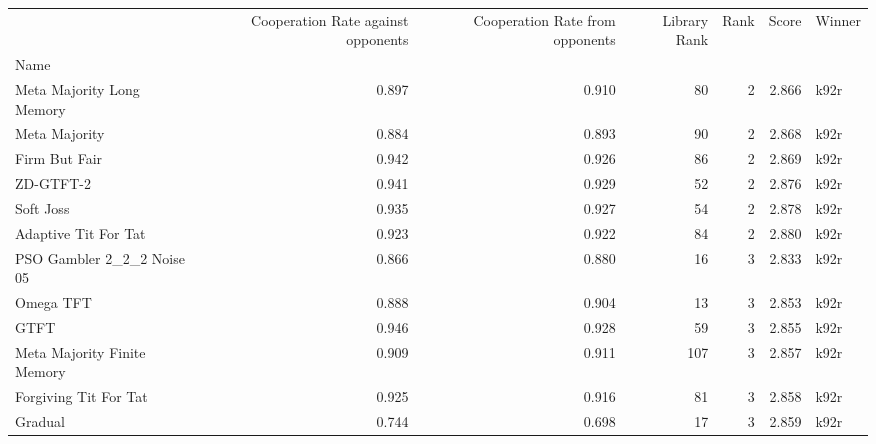 \begin{tabular}{lrrrrrl}
\toprule
{} &  Cooperation Rate against opponents &  Cooperation Rate from opponents &  Library Rank &  Rank &  Score & Winner \\
Name                        &                                     &                                  &               &       &        &        \\
\midrule
Meta Majority Long Memory   &                               0.897 &                            0.910 &            80 &     2 &  2.866 &   k92r \\
Meta Majority               &                               0.884 &                            0.893 &            90 &     2 &  2.868 &   k92r \\
Firm But Fair               &                               0.942 &                            0.926 &            86 &     2 &  2.869 &   k92r \\
ZD-GTFT-2                   &                               0.941 &                            0.929 &            52 &     2 &  2.876 &   k92r \\
Soft Joss                   &                               0.935 &                            0.927 &            54 &     2 &  2.878 &   k92r \\
Adaptive Tit For Tat        &                               0.923 &                            0.922 &            84 &     2 &  2.880 &   k92r \\
PSO Gambler 2\_2\_2 Noise 05  &                               0.866 &                            0.880 &            16 &     3 &  2.833 &   k92r \\
Omega TFT                   &                               0.888 &                            0.904 &            13 &     3 &  2.853 &   k92r \\
GTFT                        &                               0.946 &                            0.928 &            59 &     3 &  2.855 &   k92r \\
Meta Majority Finite Memory &                               0.909 &                            0.911 &           107 &     3 &  2.857 &   k92r \\
Forgiving Tit For Tat       &                               0.925 &                            0.916 &            81 &     3 &  2.858 &   k92r \\
Gradual                     &                               0.744 &                            0.698 &            17 &     3 &  2.859 &   k92r \\

\end{tabular}
